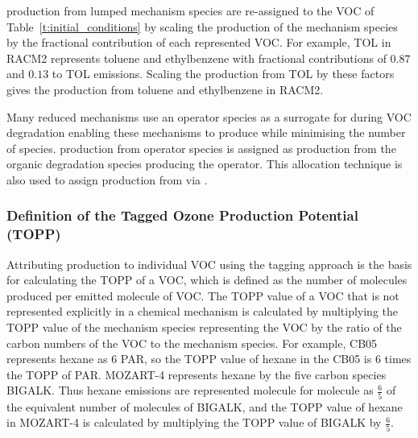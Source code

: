  production from lumped mechanism species are re-assigned to the VOC of \mbox{Table \ref{t:initial_conditions}} by scaling the  production of the mechanism species by the fractional contribution of each represented VOC.
For example, TOL in RACM2 represents toluene and ethylbenzene with fractional contributions of $0.87$ and $0.13$ to TOL emissions.
Scaling the  production from TOL by these factors gives the  production from toluene and ethylbenzene in RACM2.

Many reduced mechanisms use an operator species as a surrogate for  during VOC degradation enabling these mechanisms to produce  while minimising the number of  species.
 production from operator species is assigned as  production from the organic degradation species producing the operator.
This allocation technique is also used to assign  production from  via .
%
\subsubsection{Definition of the Tagged Ozone Production Potential (TOPP)} \label{sss:TOPP} %
%
Attributing  production to individual VOC using the tagging approach is the basis for calculating the TOPP of a VOC, which is defined as the number of  molecules produced per emitted molecule of VOC.
The TOPP value of a VOC that is not represented explicitly in a chemical mechanism is calculated by multiplying the TOPP value of the mechanism species representing the VOC by the ratio of the carbon numbers of the VOC to the mechanism species.
For example, CB05 represents hexane as $6$ PAR, so the TOPP value of hexane in the CB05 is $6$ times the TOPP of PAR.
MOZART-4 represents hexane by the five carbon species BIGALK.
Thus hexane emissions are represented molecule for molecule as $\frac{6}{5}$ of the equivalent number of molecules of BIGALK, and the TOPP value of hexane in MOZART-4 is calculated by multiplying the TOPP value of BIGALK by $\frac{6}{5}$.
